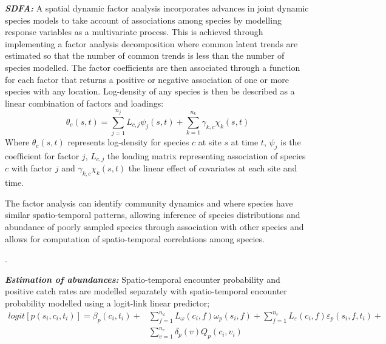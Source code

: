 \documentclass{nature}
\begin{document}
\begin{linenumbers}
\textbf{\textit{SDFA:}} A spatial dynamic factor analysis incorporates advances
in joint dynamic species models\cite{Thorson2017} to take account of
associations among species by modelling response variables as a multivariate
process. This is achieved through implementing a factor analysis decomposition
where common latent trends are estimated so that the number of common trends is
less than the number of species modelled. The factor coefficients are then
associated through a function for each factor that returns a positive or
negative association of one or more species with any location. Log-density of
any species is then be described as a linear combination of factors and
loadings: \begin{equation} \theta_{c}(s,t) = \sum_{j=1}^{n_{j}}
	L_{c,j}\psi_{j}(s,t) +\sum_{k=1}^{n_{k}} \gamma_{k,c}\chi_{k}(s,t)
\end{equation} Where $\theta_{c}(s,t)$ represents log-density for species $c$
at site $s$ at time $t$, $\psi_{j}$ is the coefficient for factor $j$,
$L_{c,j}$ the loading matrix representing association of species $c$ with
factor $j$ and $\gamma_{k,c}\chi_{k}(s,t)$ the linear effect of covariates at
each site and time\cite{Thorson2016b}. 

The factor analysis can identify community dynamics and where species have
similar spatio-temporal patterns, allowing inference of species distributions
and abundance of poorly sampled species through association with other species
and allows for computation of spatio-temporal correlations among
species\cite{Thorson2016b}.

. 

\textbf{\textit{Estimation of abundances:}} Spatio-temporal encounter
probability and positive catch rates are modelled separately with
spatio-temporal encounter probability modelled using a logit-link linear
predictor;
		\begin{equation}
			\begin{split}
			logit[p(s_{i},c_{i},t_{i})] =	\beta_{p}(c_{i},t_{i}) +
			& \sum\limits_{f=1}^{n_{\omega}} L_{\omega}(c_{i},f)
			\omega_{p}(s_{i},f) + \sum\limits_{f=1}^{n_{\varepsilon}}
			L_{\varepsilon}(c_{i},f) \varepsilon_{p}(s_{i},f,t_{i}) + \\ 
			& \sum\limits_{v=1}^{n_{v}}\delta_{p}(v)Q_{p}(c_{i}, v_{i})
		\end{split}
		\end{equation}


\end{linenumbers}
\end{document}
